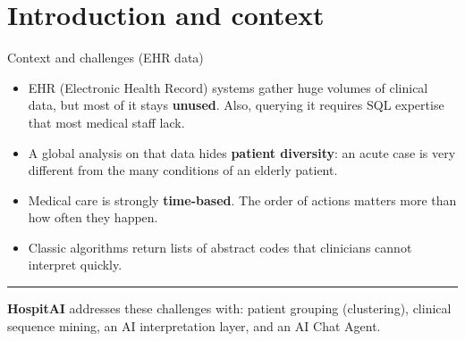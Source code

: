 \documentclass[aspectratio=169,11pt]{beamer}
\newcommand{\kw}[1]{{\color{hospaccent}\bfseries #1}}
\begin{document}
\section{Introduction and context}

\begin{frame}{Context and challenges (EHR data)}
  \vspace{0.3em}
  \begin{itemize}\setlength{\itemsep}{0.6em}
    \item EHR (Electronic Health Record) systems gather huge volumes of clinical data, but most of it stays \kw{unused}. Also, querying it requires SQL expertise that most medical staff lack.
    \item A global analysis on that data hides \kw{patient diversity}: an acute case is very different from the many conditions of an elderly patient.
    \item Medical care is strongly \kw{time-based}. The order of actions matters more than how often they happen.
    \item Classic algorithms return lists of abstract codes that clinicians cannot interpret quickly.
  \end{itemize}
  \vfill
  {\color{hosprule}\rule{2.5pt}{1.1em}\hspace{6pt}%
   \kw{HospitAI} addresses these challenges with: patient grouping (clustering), clinical sequence mining, an AI interpretation layer, and an AI Chat Agent.}
\end{frame}
\end{document}
